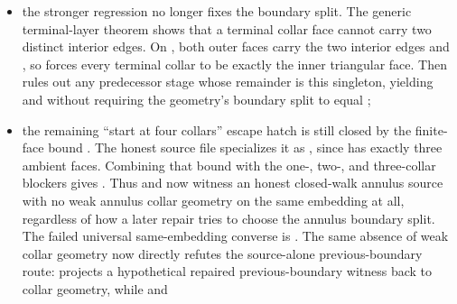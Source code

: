 \documentclass[11pt]{article}
\begin{document}
\begin{itemize}
actual obstruction threshold starts only at exact multi-collar or stronger
same-embedding geometry;
\item the stronger regression no longer fixes the boundary split.  The generic
terminal-layer theorem
shows that a terminal collar face cannot carry two distinct interior edges.  On
, both outer faces carry the two
interior edges  and , so
 forces every terminal collar
to be exactly the inner triangular face.  Then
 rules out any
predecessor stage whose remainder is this singleton, yielding
and
without requiring the geometry's boundary split to equal
;
\item the remaining ``start at four collars'' escape hatch is still closed by
the finite-face bound
.  The honest
source file specializes it as
,
since  has exactly three ambient faces.
Combining that bound with the one-, two-, and three-collar blockers gives
.
Thus
and
now witness an honest closed-walk annulus source with no weak annulus collar
geometry on the same embedding at all, regardless of how a later repair tries
to choose the annulus boundary split.  The failed universal same-embedding
converse is
.
The same absence of weak collar geometry now directly refutes the
source-alone previous-boundary route:
projects a hypothetical repaired previous-boundary witness back to collar
geometry, while
and

\end{itemize}
\end{document}
